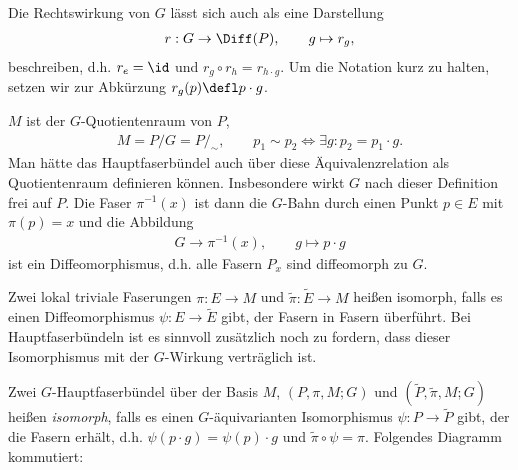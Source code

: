 \documentclass[%
	paper=a5,%
	fleqn,%
	DIV=18,%
	BCOR=0mm,
	fontsize=11pt,
	titlepage=false,%
	bibliography=totoc,
	DIV=18,%
	twoside=true,
	pdftitle=Riemannsche Geometrie,
	pdfauthor=Uwe Semmelmann,
	numbers=noendperiod]%
	{scrbook}
\begin{document}
\begin{rem}[Bemerkungen.]
\begin{remenum}
\item
Die Rechtswirkung von $G$ lässt sich auch als eine Darstellung
\begin{align*}
r: G\to \Diff(P),\qquad g\mapsto r_g,
\end{align*}
beschreiben, d.h.  $r_e = \id$ und $r_g\circ r_h = r_{h\cdot g}$. Um die Notation
kurz zu halten, setzen wir zur Abkürzung $r_g(p)\defl p\cdot g$.
\item
$M$ ist der $G$-Quotientenraum von $P$,
\begin{align*}
M = P/G = P/_\sim,\qquad p_1\sim p_2 \iff \exists g : p_2 = p_1\cdot g.
\end{align*}
Man hätte das Hauptfaserbündel auch über diese Äquivalenzrelation als
Quotientenraum definieren können. Insbesondere wirkt $G$ nach dieser Definition
frei auf $P$. Die Faser $\pi^{-1}(x)$ ist dann die $G$-Bahn durch einen Punkt $p\in E$ mit
$\pi(p) = x$ und die Abbildung
\begin{align*}
G \to \pi^{-1}(x),\qquad g\mapsto p\cdot g
\end{align*}
ist ein Diffeomorphismus, d.h. alle Fasern $P_x$ sind diffeomorph zu $G$.\map 
\end{remenum}
\end{rem}





Zwei lokal triviale Faserungen $\pi\colon E\to M$ und $\tilde{\pi}\colon \tilde{E}\to M$
heißen isomorph, falls es einen Diffeomorphismus $\psi\colon E\to \tilde{E}$ gibt,
der Fasern in Fasern überführt. Bei Hauptfaserbündeln ist es sinnvoll zusätzlich
noch zu fordern, dass dieser Isomorphismus mit der $G$-Wirkung verträglich ist.

\begin{defn}
Zwei $G$-Hauptfaserbündel über der Basis $M$, $(P,\pi,M;G)$ und
$(\tilde{P},\tilde{\pi},M;G)$ heißen \emph{isomorph}, falls es einen
$G$-äquivarianten Isomorphismus $\psi\colon P\to \tilde{P}$ gibt, der die Fasern
erhält, d.h.  $\psi(p \cdot g) = \psi(p) \cdot g $ und  $\tilde{\pi} \circ \psi=\pi$. 
Folgendes Diagramm kommutiert:

\centering
{}
\fish
\end{defn}
\end{document}
